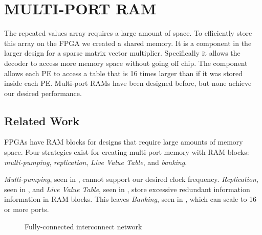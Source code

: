 \chapter{MULTI-PORT RAM}
\label{chp:memory}
The repeated values array requires a large amount of space. To efficiently store this array on the FPGA we created a shared memory. It is a component in the larger design for a sparse matrix vector multiplier. Specifically it allows the decoder to access more memory space without going off chip. The component allows each PE to access a table that is 16 times larger than if it was stored inside each PE. Multi-port RAMs have been designed before, but none achieve our desired performance.

\section{Related Work}
\label{sec:relatedwork}
FPGAs have RAM blocks for designs that require large amounts of memory space. Four strategies exist for creating multi-port memory with RAM blocks: {\em multi-pumping}, {\em replication}, {\em Live Value Table}, and {\em banking}. \par
{\em Multi-pumping}, seen in \cite{prelim:manjikian,prelim:canis,prelim:yantir}, cannot support our desired clock frequency. {\em Replication}, seen in \cite{prelim:fort,prelim:mousali,prelim:yiannacouras}, and {\em Live Value Table}, seen in \cite{prelim:laforest,prelim:anjam,prelim:abdelhadi}, store excessive redundant information information in RAM blocks. This leaves {\em Banking}, seen in \cite{prelim:moscola,prelim:saghir,prelim:saghir2}, which can scale to 16 or more ports.\par

    \begin{figure}
        \center
        \caption{Fully-connected interconnect network}
        \label{fig:crossbar}
    \end{figure}

